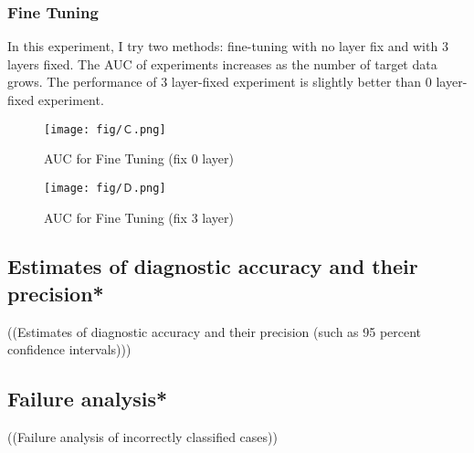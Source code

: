 \subsubsection{Fine Tuning}
In this experiment, I try two methods: fine-tuning with no layer fix and with 3 layers fixed. The AUC of experiments increases as the number of target data grows. The performance of 3 layer-fixed experiment is slightly better than 0 layer-fixed experiment.
\begin{figure}[H]
    \hfil
    \begin{minipage}[t]{0.9\textwidth}
        \texttt{[image: fig/Ｃ.png]}
        \caption{\label{fig:parallel1} AUC for Fine Tuning (fix 0 layer)}
    \end{minipage}
    \hfil
\end{figure}
\begin{figure}[H]
    \hfil
    \begin{minipage}[t]{0.9\textwidth}
        \texttt{[image: fig/Ｄ.png]}
        \caption{\label{fig:parallel1} AUC for Fine Tuning (fix 3 layer)}
    \end{minipage}
    \hfil
\end{figure}

\subsection{Estimates of diagnostic accuracy and their precision*}
((Estimates of diagnostic accuracy and their precision (such as 95 percent confidence intervals))) \\
\subsection{Failure analysis*}
((Failure analysis of incorrectly classified cases)) \\


